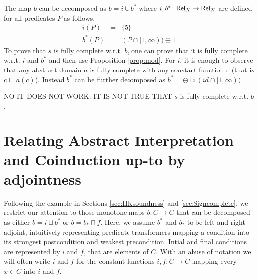 \documentclass{llncs}
\begin{document}
The map $b$ can be decomposed as $b=i \cup b^*$ where $i,b^* \colon \mathsf{Rel}_X\to  \mathsf{Rel}_X$ are defined for all predicates $P$ as follows.
\begin{equation}
\begin{array}{rcl}
i(P) & = & \{ 5 \}\\
b^*(P) & =& (P\cap [1,\infty) ) \ominus\! 1 
\end{array}
\end{equation}
To prove that $s$ is fully complete w.r.t. $b$, one can prove that it is fully complete w.r.t. $i$ and $b^*$ and then use Proposition \ref{prop:mod}. For $i$, it is enough to observe that any abstract domain $a$ is fully complete with any constant function $c$ (that is $c\sqsubseteq a(c)$). Instead $b^*$ can be further decomposed as $b^*= \ominus\!1 \circ (id\cap [1,\infty)) $

NO IT DOES NOT WORK: IT IS NOT TRUE THAT $s$ is fully complete w.r.t. $b$,


\section{Relating Abstract Interpretation and Coinduction up-to by adjointness}
%
Following the example in Sections \ref{sec:HKsoundness} and \ref{sec:Signcomplete}, we restrict our attention to those monotone maps $b\colon C \to C$ that can be decomposed as either $b=i \sqcup b^*$ or $b= b_* \sqcap f$.  %
%
Here, we assume $b^*$ and $b_*$ to be left and right adjoint, intuitively representing  predicate transformers mapping a condition into its strongest postcondition and weakest precondition. Intial and final conditions are represented by $i$ and $f$, that are elements of $C$. With an abuse of notation we will often write $i$ and $f$ for the constant functions $i,f\colon C \to C$ mapping every $x\in C$ into $i$ and $f$.
\end{document}
